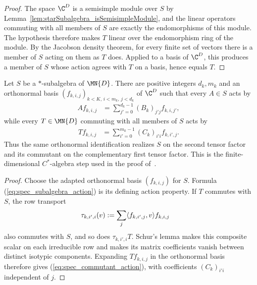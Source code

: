 \begin{proof}
    \leanok
    The space $\C^D$ is a semisimple module over $S$ by
    Lemma~\ref{lem:starSubalgebra_isSemisimpleModule}, and the linear
    operators commuting with all members of $S$ are exactly the
    endomorphisms of this module. The hypothesis therefore makes $T$ linear
    over the endomorphism ring of the module. By the Jacobson density
    theorem, for every finite set of vectors there is a member of $S$ acting
    on them as $T$ does. Applied to a basis of $\C^D$, this produces a
    member of $S$ whose action agrees with $T$ on a basis, hence equals $T$.
\end{proof}

\begin{theorem}%
    \label{thm:starSubalgebra_complementary_spatial_actions}
    \leanok
    Let $S$ be a $*$-subalgebra of $\MN{D}$. There are positive integers
    $d_k,m_k$ and an orthonormal basis
    $(f_{k,i,j})_{k<K,\,i<m_k,\,j<d_k}$ of $\C^D$ such that every $A\in S$
    acts by
    \begin{align}
        A f_{k,i,j}
        &=\sum_{j'=0}^{d_k-1}(B_k)_{j'j}f_{k,i,j'},
        \label{eq:spec_subalgebra_action}
    \end{align}
    while every $T\in\MN{D}$ commuting with all members of $S$ acts by
    \begin{align}
        T f_{k,i,j}
        &=\sum_{i'=0}^{m_k-1}(C_k)_{i'i}f_{k,i',j}.
        \label{eq:spec_commutant_action}
    \end{align}
    Thus the same orthonormal identification realizes $S$ on the second
    tensor factor and its commutant on the complementary first tensor
    factor. This is the finite-dimensional $C^*$-algebra step used in the
    proof of~\cite[Lemma~2.1]{Beigi2012Classification}.
\end{theorem}

\begin{proof}
    \leanok
    Choose the adapted orthonormal basis $(f_{k,i,j})$ for $S$.
    Formula (\ref{eq:spec_subalgebra_action}) is its defining action
    property. If $T$ commutes with $S$, the row transport
    \begin{align}
        \tau_{k,i',i}(v)
        &:=\sum_j\langle f_{k,i',j},v\rangle f_{k,i,j}
        \notag
    \end{align}
    also commutes with $S$, and so does $\tau_{k,i',i}T$. Schur's lemma
    makes this composite scalar on each irreducible row and makes its matrix
    coefficients vanish between distinct isotypic components. Expanding
    $Tf_{k,i,j}$ in the orthonormal basis therefore gives
    (\ref{eq:spec_commutant_action}), with coefficients
    $(C_k)_{i'i}$ independent of $j$.
\end{proof}

